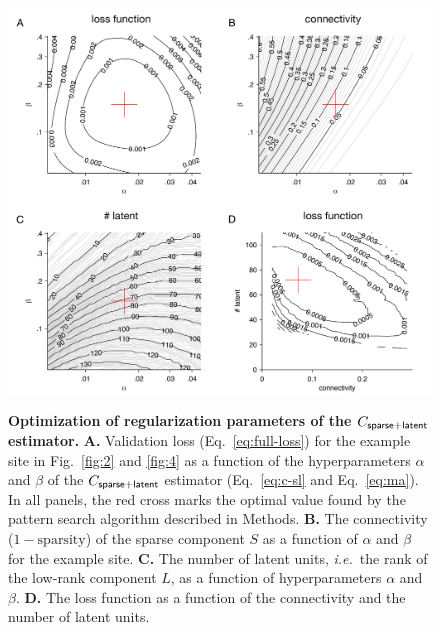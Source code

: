 \begin{figure}
\begin{fullpage}

\begin{center}
\includegraphics[width=\textwidth]{./figures/HyperSpace.pdf}
\end{center}

\begin{caption}
{\bf Optimization of regularization parameters of the $C_{\sf sparse+latent}$ estimator.} {\bf A.} Validation loss (Eq.~\ref{eq:full-loss}) for the example site in Fig.~\ref{fig:2} and \ref{fig:4} as a function of the hyperparameters $\alpha$ and $\beta$ of the $C_{\sf sparse+latent}$ estimator (Eq.~\ref{eq:c-sl} and Eq.~\ref{eq:ma}). In all panels, the red cross marks the optimal value found by the pattern search algorithm described in Methods.
{\bf B.} The connectivity ($1-\mbox{sparsity}$) of the sparse component $S$ as a function of $\alpha$ and $\beta$ for the example site.
{\bf C.} The number of latent units, \emph{i.e.}~the rank of the low-rank component $L$, as a function of hyperparameters $\alpha$ and $\beta$.
{\bf D.} The loss function as a function of the connectivity and the number of latent units.
\end{caption}\label{fig:S1}
\end{fullpage}
\end{figure}
